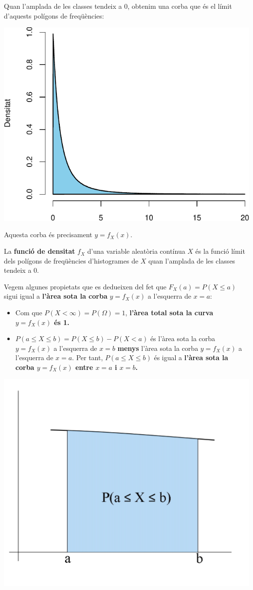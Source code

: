 \documentclass[
]{book}
\renewcommand{\leq}{\leqslant}
\newenvironment{rmdblock}[1]
  {
  \begin{itemize}
  \renewcommand{\labelitemi}{
    \raisebox{-.7\height}[0pt][0pt]{
      {\setkeys{Gin}{width=3em,keepaspectratio}\texttt{[image: Bioestadística-II\_files/figure-html/\#1]}}
    }
  }
  \setlength{\fboxsep}{1em}
  \begin{kframe}
  \item
  }
  {
  \end{kframe}
  \end{itemize}
  }
\newenvironment{rmdimportant}
  {\begin{rmdblock}{important}}
  {\end{rmdblock}}
\theoremstyle{definition}
\theoremstyle{definition}
\theoremstyle{definition}
\theoremstyle{remark}
\begin{document}
Quan l'amplada de les classes tendeix a 0, obtenim una corba que és el límit d'aquests polígons de freqüències:

\begin{center}\includegraphics[width=0.5\linewidth]{Bioestadistica-II_files/figure-latex/unnamed-chunk-58-1} \end{center}

Aquesta corba és precisament \(y=f_X(x)\).

\begin{rmdimportant}
La \textbf{funció de densitat} \(f_X\) d'una variable aleatòria contínua \(X\) és la funció límit dels polígons de freqüències d'histogrames de \(X\) quan l'amplada de les classes tendeix a 0.
\end{rmdimportant}

Vegem algunes propietats que es dedueixen del fet que \(F_X(a)=P(X\leq a)\) sigui igual a \textbf{l'àrea sota la corba} \(y=f_X(x)\) a l'esquerra de \(x=a\):

\begin{itemize}
\item
  Com que \(P(X<\infty)=P(\Omega)=1\), \textbf{l'àrea total sota la curva \(y=f_X(x)\) és 1.}
\item
  \(P(a\leq X\leq b)=P(X\leq b)-P(X<a)\) és l'àrea sota la corba \(y=f_X(x)\) a l'esquerra de \(x=b\) \textbf{menys} l'àrea sota la corba \(y=f_X(x)\) a l'esquerra de \(x=a\). Per tant, \(P(a\leq X\leq b)\) és igual a \textbf{l'àrea sota la corba \(y=f_X(x)\) entre \(x=a\) i \(x=b\).}
\end{itemize}

\begin{center}\includegraphics[width=0.6\linewidth]{Bioestadistica-II_files/figure-html/entreaib} \end{center}
\end{document}
